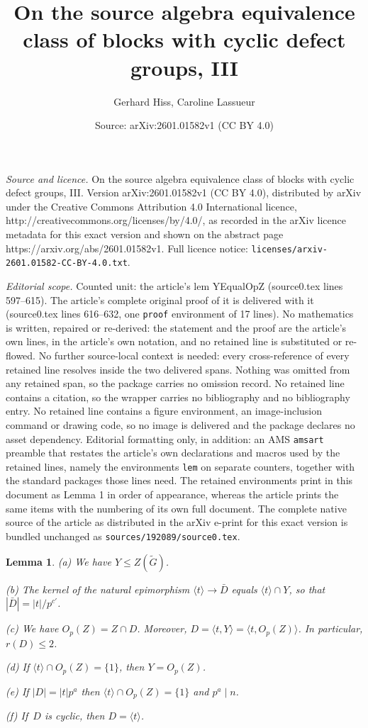 \documentclass[10pt,a4paper]{amsart}
\title{On the source algebra equivalence class of blocks with cyclic defect groups, III}
\author{Gerhard Hiss, Caroline Lassueur}
\date{Source: arXiv:2601.01582v1 (CC BY 4.0)}
\newtheorem{lem}{Lemma}
\begin{document}
\maketitle

\noindent\emph{Source and licence.} On the source algebra equivalence class of blocks with cyclic defect groups, III. Version arXiv:2601.01582v1 (CC BY 4.0), distributed by arXiv under the Creative Commons Attribution 4.0 International licence, http://creativecommons.org/licenses/by/4.0/, as recorded in the arXiv licence metadata for this exact version and shown on the abstract page https://arxiv.org/abs/2601.01582v1. Full licence notice: \texttt{licenses/arxiv-2601.01582-CC-BY-4.0.txt}.\par\smallskip

\noindent\textit{Editorial scope.} Counted unit: the article's lem YEqualOpZ (source0.tex lines 597--615). The article's complete original proof of it is delivered with it (source0.tex lines 616--632, one \texttt{proof} environment of 17 lines). No mathematics is written, repaired or re-derived: the statement and the proof are the article's own lines, in the article's own notation, and no retained line is substituted or re-flowed.  No further source-local context is needed: every cross-reference of every retained line resolves inside the two delivered spans.  Nothing was omitted from any retained span, so the package carries no omission record.  No retained line contains a citation, so the wrapper carries no bibliography and no bibliography entry.  No retained line contains a figure environment, an image-inclusion command or drawing code, so no image is delivered and the package declares no asset dependency.  Editorial formatting only, in addition: an AMS \texttt{amsart} preamble that restates the article's own declarations and macros used by the retained lines, namely the environments \texttt{lem} on separate counters, together with the standard packages those lines need.  The retained environments print in this document as Lemma 1 in order of appearance, whereas the article prints the same items with the numbering of its own full document.  The complete native source of the article as distributed in the arXiv e-print for this exact version is bundled unchanged as \texttt{sources/192089/source0.tex}.
\begin{lem}
\label{YEqualOpZ}
{\rm (a)} We have $Y \leq Z( \tilde{G} )$.

{\rm (b)} The kernel of the natural epimorphism 
$\langle t \rangle \rightarrow \bar{D}$ equals $\langle t \rangle \cap Y$, so
that $|\bar{D}| = |t|/p^{c'}$.

{\rm (c)} We have $O_p( Z ) = Z \cap D$. Moreover, 
$D = \langle t, Y \rangle = \langle t, O_p(Z) \rangle$. In particular, 
$r(D) \leq 2$.

{\rm (d)} If $\langle t \rangle \cap O_p( Z ) = \{ 1 \}$, then $Y = O_p( Z )$.

{\rm (e)} If $|D| = |t|p^{a}$ then 
$\langle t \rangle \cap O_p( Z ) = \{ 1 \}$ and $p^a \mid n$.

{\rm (f)} If~$D$ is cyclic, then $D = \langle t \rangle$.
\end{lem}
\end{document}
